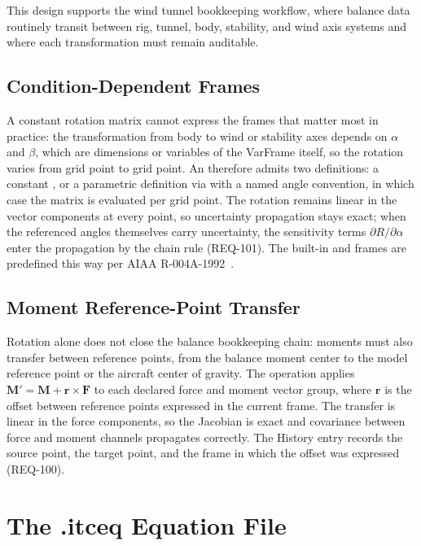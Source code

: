 This design supports the wind tunnel bookkeeping workflow, where balance
data routinely transit between rig, tunnel, body, stability, and wind axis
systems and where each transformation must remain auditable.

\subsection{Condition-Dependent Frames}
\label{sec:condition-frames}

A constant rotation matrix cannot express the frames that matter most in
practice: the transformation from body to wind or stability axes depends on
$\alpha$ and $\beta$, which are dimensions or variables of the VarFrame
itself, so the rotation varies from grid point to grid point. An
 therefore admits two definitions: a constant
, or a parametric definition via
 with a named angle convention, in
which case the matrix is evaluated per grid point. The rotation remains
linear in the vector components at every point, so uncertainty propagation
stays exact; when the referenced angles themselves carry uncertainty, the
sensitivity terms $\partial R / \partial \alpha$ enter the propagation by
the chain rule (REQ-101). The built-in  and
 frames are predefined this way per AIAA
R-004A-1992~\citep{aiaaR004A}.

\subsection{Moment Reference-Point Transfer}
\label{sec:moment-transfer}

Rotation alone does not close the balance bookkeeping chain: moments must
also transfer between reference points, from the balance moment center to
the model reference point or the aircraft center of gravity. The operation
 applies
$\mathbf{M}' = \mathbf{M} + \mathbf{r} \times \mathbf{F}$ to each declared
force and moment vector group, where $\mathbf{r}$ is the offset between
reference points expressed in the current frame. The transfer is linear in
the force components, so the Jacobian is exact and covariance between force
and moment channels propagates correctly. The History entry records the
source point, the target point, and the frame in which the offset was
expressed (REQ-100).

\section{The .itceq Equation File}
\label{sec:itceq}

